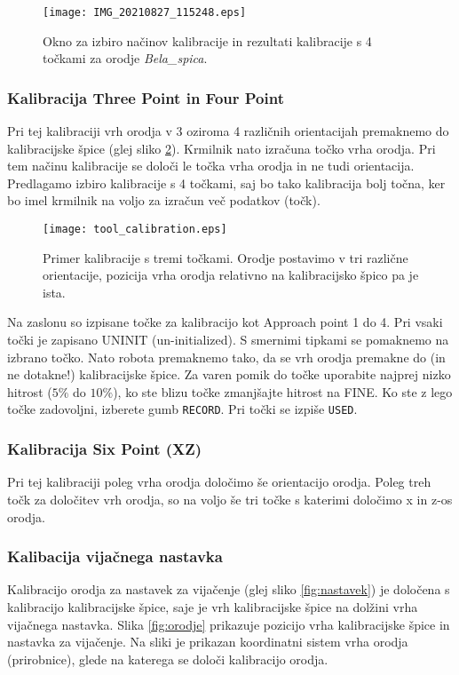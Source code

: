 \begin{figure}[!hbt]
	\centering
	\texttt{[image: IMG\_20210827\_115248.eps]}
	\caption{Okno za izbiro načinov kalibracije in rezultati kalibracije s 4 točkami za orodje {\em Bela\_spica}.}
	\label{fig:calib_seznam}
\end{figure}

\subsubsection{Kalibracija Three Point in Four Point}

Pri tej kalibraciji vrh orodja v 3 oziroma 4 različnih orientacijah premaknemo do kalibracijske špice (glej sliko \ref{fig:tool_3}). Krmilnik nato izračuna točko vrha orodja. Pri tem načinu kalibracije se določi le točka vrha orodja in ne tudi orientacija. Predlagamo izbiro kalibracije s 4 točkami, saj bo tako kalibracija bolj točna, ker bo imel krmilnik na voljo za izračun več podatkov (točk).

\begin{figure}[!hbt]
	\centering
	\texttt{[image: tool\_calibration.eps]}
	\caption{Primer kalibracije s tremi točkami. Orodje postavimo v tri različne orientacije, pozicija vrha orodja relativno na kalibracijsko špico pa je ista.}
	\label{fig:tool_3}
\end{figure}

Na zaslonu so izpisane točke za kalibracijo kot Approach point 1 do 4. Pri vsaki točki je zapisano UNINIT (un-initialized). S smernimi tipkami se pomaknemo na izbrano točko. Nato robota premaknemo tako, da se vrh orodja premakne do (in ne dotakne!) kalibracijske špice. Za varen pomik do točke uporabite najprej nizko hitrost ($5\%$ do $10\%$), ko ste blizu točke zmanjšajte hitrost na FINE. Ko ste z lego točke zadovoljni, izberete gumb \verb|RECORD|. Pri točki se izpiše \verb|USED|.

\subsubsection{	Kalibracija Six Point (XZ)}
Pri tej kalibraciji poleg vrha orodja določimo še orientacijo orodja. Poleg treh točk za določitev vrh orodja, so na voljo še tri točke s katerimi določimo x in z-os orodja.

\subsubsection{Kalibacija vijačnega nastavka}
 Kalibracijo orodja za nastavek za vijačenje (glej sliko \ref{fig:nastavek}) je določena s kalibracijo kalibracijske špice, saje je vrh kalibracijske špice na dolžini vrha vijačnega nastavka. Slika \ref{fig:orodje} prikazuje pozicijo vrha kalibracijske špice  in nastavka za vijačenje. Na sliki je prikazan koordinatni sistem vrha orodja (prirobnice), glede na katerega se določi kalibracijo orodja. 

